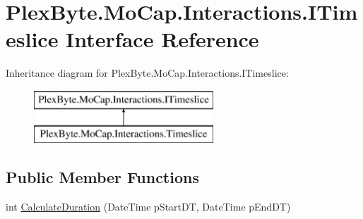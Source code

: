 \hypertarget{interface_plex_byte_1_1_mo_cap_1_1_interactions_1_1_i_timeslice}{}\section{Plex\+Byte.\+Mo\+Cap.\+Interactions.\+I\+Timeslice Interface Reference}
\label{interface_plex_byte_1_1_mo_cap_1_1_interactions_1_1_i_timeslice}
Inheritance diagram for Plex\+Byte.\+Mo\+Cap.\+Interactions.\+I\+Timeslice\+:\begin{figure}[H]
\begin{center}
\leavevmode
\includegraphics[height=2.000000cm]{interface_plex_byte_1_1_mo_cap_1_1_interactions_1_1_i_timeslice}
\end{center}
\end{figure}
\subsection*{Public Member Functions}
\begin{DoxyCompactItemize}
\item 
int \hyperlink{interface_plex_byte_1_1_mo_cap_1_1_interactions_1_1_i_timeslice_a4cf2fbe8712024476536bd187dab494c}{Calculate\+Duration} (Date\+Time p\+Start\+DT, Date\+Time p\+End\+DT)
\end{DoxyCompactItemize}
